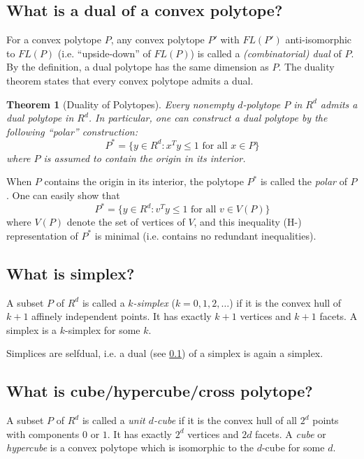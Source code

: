 \documentclass[a4paper,12pt]{article}
\newtheorem{theorem}{Theorem}
\begin{document}
\subsection{What is a dual of a convex polytope?} \label{polytope:dual}

For a convex polytope $P$, any convex polytope $P'$ with $FL(P')$
anti-isomorphic to $FL(P)$ (i.e. ``upside-down'' of $FL(P)$)
is called a {\em (combinatorial) dual\/} of $P$.  By the definition,
a dual polytope has the same dimension as $P$. The duality theorem
states that every convex polytope admits a dual.

\begin{theorem} [Duality of Polytopes] \label{thm:polydual}
Every nonempty $d$-polytope $P$ in $R^d$ 
admits a dual polytope in $R^d$.  In particular,
one can construct a dual polytope by the following ``polar'' construction:
\[
  P^* = \{y \in R^d:  x^T y \le 1 \text{ for all } x \in P \}
\]
where $P$ is assumed to contain the origin in its interior.
\end{theorem}

When $P$ contains the origin in its interior,
the polytope $P^*$ is called the {\em polar\/} of $P$.   One can
easily show that
\[
  P^* = \{y \in R^d:  v^T y \le 1 \text{ for all } v \in  V(P) \}
\]
where $V(P)$ denote the set of vertices of $V$, and this inequality
(H-) representation of $P^*$ is minimal (i.e. contains 
no redundant inequalities).

\subsection{What is simplex?} \label{polytope:simplex}

A subset $P$ of $R^d$ is called a {\em $k$-simplex\/} ($k =0,1, 2, \ldots$)
if it is the convex hull of $k+1$ affinely independent points. It has
exactly $k+1$ vertices and $k+1$ facets.   A simplex is
a $k$-simplex for some $k$.

Simplices are selfdual, i.e. a dual (see \ref{polytope:dual}) of a simplex is again a simplex.

\subsection{What is cube/hypercube/cross polytope?} \label{polytope:hypercube}

A subset $P$ of $R^d$ is called a {\em unit $d$-cube\/} if it is
the convex hull of all $2^d$ points with components $0$ or $1$.   It has
exactly $2^d$ vertices and $2 d$ facets.  A {\em cube\/} or 
{\em hypercube\/} is a 
convex polytope which is isomorphic to the $d$-cube for some
$d$.
\end{document}
